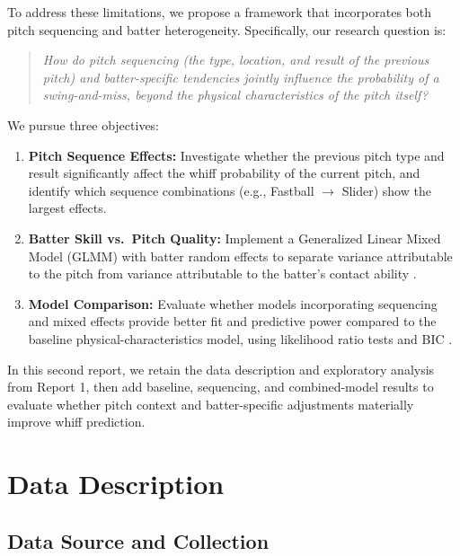 \documentclass[11pt]{article}
\begin{document}
To address these limitations, we propose a framework that incorporates both pitch sequencing and batter heterogeneity.
Specifically, our research question is:

\begin{quote}
\centering
\textit{How do pitch sequencing (the type, location, and result of the previous pitch) and batter-specific tendencies jointly influence the probability of a swing-and-miss, beyond the physical characteristics of the pitch itself?}
\end{quote}

\noindent
We pursue three objectives:
\begin{enumerate}[leftmargin=3em, label=\textbf{\arabic*.}]
    \item \textbf{Pitch Sequence Effects:} Investigate whether the previous pitch type and result significantly affect the whiff probability of the current pitch, and identify which sequence combinations (e.g., Fastball $\rightarrow$ Slider) show the largest effects.
    \item \textbf{Batter Skill vs.\ Pitch Quality:} Implement a Generalized Linear Mixed Model (GLMM) with batter random effects to separate variance attributable to the pitch from variance attributable to the batter's contact ability \citep{gelman2006data, bolker2009glmm}.
    \item \textbf{Model Comparison:} Evaluate whether models incorporating sequencing and mixed effects provide better fit and predictive power compared to the baseline physical-characteristics model, using likelihood ratio tests and BIC \citep{mccullagh2019generalized}.
\end{enumerate}

In this second report, we retain the data description and exploratory analysis from Report 1, then add baseline, sequencing, and combined-model results to evaluate whether pitch context and batter-specific adjustments materially improve whiff prediction.

\section{Data Description}

\subsection{Data Source and Collection}
\end{document}
